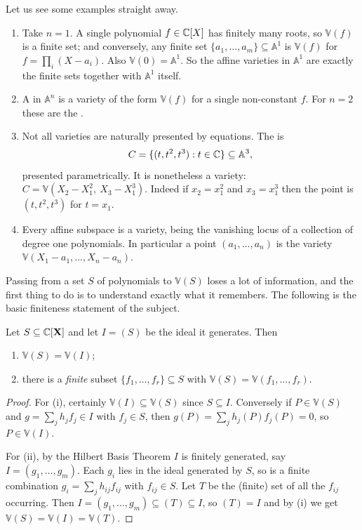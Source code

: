 \documentclass[a4paper]{scrartcl}
\newcommand{\A}{\mathbb{A}}
\newcommand{\V}{\mathbb{V}}
\begin{document}
Let us see some examples straight away.

\begin{example}
	\begin{enumerate}[label=(\roman*)]
		\item Take $n = 1$. A single polynomial $f \in \mathbb{C}[X]$ has finitely many roots, so $\V(f)$ is a finite set; and conversely, any finite set $\{a_1,\dots,a_m\} \subseteq \A^1$ is $\V(f)$ for $f = \prod_i (X - a_i)$. Also $\V(0) = \A^1$. So the affine varieties in $\A^1$ are exactly the finite sets together with $\A^1$ itself.
		\item A  in $\A^n$ is a variety of the form $\V(f)$ for a single non-constant $f$. For $n = 2$ these are the .
		\item Not all varieties are naturally presented by equations. The  is
		$$C = \{(t,t^2,t^3) : t \in \C\} \subseteq \A^3,$$
		presented parametrically. It is nonetheless a variety: $C = \V(X_2 - X_1^2,\ X_3 - X_1^3)$. Indeed if $x_2 = x_1^2$ and $x_3 = x_1^3$ then the point is $(t,t^2,t^3)$ for $t = x_1$.
		\item Every affine subspace is a variety, being the vanishing locus of a collection of degree one polynomials. In particular a point $(a_1,\dots,a_n)$ is the variety $\V(X_1-a_1,\dots,X_n-a_n)$.
	\end{enumerate}
\end{example}

Passing from a set $S$ of polynomials to $\V(S)$ loses a lot of information, and the first thing to do is to understand exactly what it remembers. The following is the basic finiteness statement of the subject.

\begin{theorem}\label{thm:Vfinite}
	Let $S \subseteq \mathbb{C}[\mathbf{X}]$ and let $I = (S)$ be the ideal it generates. Then
	\begin{enumerate}[label=(\roman*)]
		\item $\V(S) = \V(I)$;
		\item there is a \emph{finite} subset $\{f_1,\dots,f_r\} \subseteq S$ with $\V(S) = \V(f_1,\dots,f_r)$.
	\end{enumerate}
\end{theorem}

\begin{proof}
	For (i), certainly $\V(I) \subseteq \V(S)$ since $S \subseteq I$. Conversely if $P \in \V(S)$ and $g = \sum_j h_j f_j \in I$ with $f_j \in S$, then $g(P) = \sum_j h_j(P) f_j(P) = 0$, so $P \in \V(I)$.

	For (ii), by the Hilbert Basis Theorem $I$ is finitely generated, say $I = (g_1,\dots,g_m)$. Each $g_i$ lies in the ideal generated by $S$, so is a finite combination $g_i = \sum_j h_{ij} f_{ij}$ with $f_{ij} \in S$. Let $T$ be the (finite) set of all the $f_{ij}$ occurring. Then $I = (g_1,\dots,g_m) \subseteq (T) \subseteq I$, so $(T) = I$ and by (i) we get $\V(S) = \V(I) = \V(T)$.
\end{proof}
\end{document}
